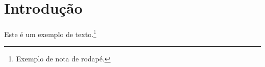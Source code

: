 \documentclass{article}
\begin{document}
\section{Introdução}
Este é um exemplo de texto.\footnote{Exemplo de nota de rodapé.}
\end{document}
